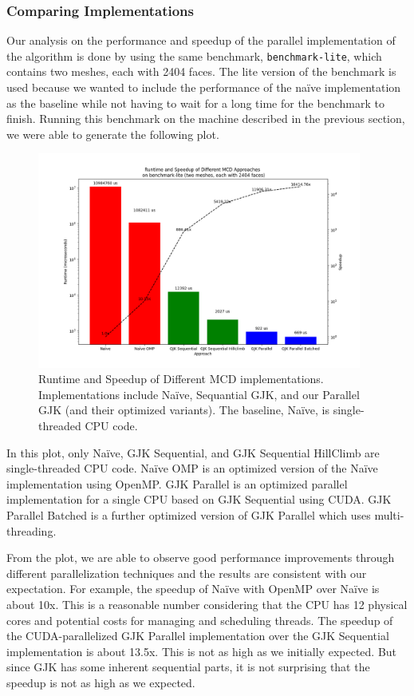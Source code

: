 \documentclass[12pt,fleqn]{article}
\newcommand{\code}[1]{\texttt{#1}}
\begin{document}
\subsubsection{Comparing Implementations}
Our analysis on the performance and speedup of the parallel implementation of the algorithm is done by using the same benchmark, \code{benchmark-lite}, which contains two meshes, each with 2404 faces.
The lite version of the benchmark is used because we wanted to include the performance of the naïve implementation as the baseline while not having to wait for a long time for the benchmark to finish.
Running this benchmark on the machine described in the previous section, we were able to generate the following plot.
\begin{figure}[ht!]
    \centering
    \includegraphics[width=0.95\textwidth]{figs/runtime_approaches.png}
    \caption{%
        Runtime and Speedup of Different MCD implementations.
        Implementations include Naïve, Sequantial GJK, and our Parallel GJK (and their optimized variants).
        The baseline, Naïve, is single-threaded CPU code.}
    \label{fig:runtime_approaches}
\end{figure}

In this plot, only Naïve, GJK Sequential, and GJK Sequential HillClimb are single-threaded CPU code.
Naïve OMP is an optimized version of the Naïve implementation using OpenMP.
GJK Parallel is an optimized parallel implementation for a single CPU based on GJK Sequential using CUDA.
GJK Parallel Batched is a further optimized version of GJK Parallel which uses multi-threading.

From the plot, we are able to observe good performance improvements through different parallelization techniques and the results are consistent with our expectation.
For example, the speedup of Naïve with OpenMP over Naïve is about 10x.
This is a reasonable number considering that the CPU has 12 physical cores and potential costs for managing and scheduling threads.
The speedup of the CUDA-parallelized GJK Parallel implementation over the GJK Sequential implementation is about 13.5x.
This is not as high as we initially expected.
But since GJK has some inherent sequential parts, it is not surprising that the speedup is not as high as we expected.
\end{document}
